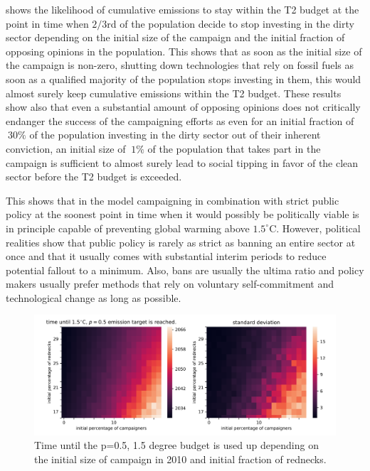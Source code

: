  shows the likelihood of cumulative emissions to stay within the T2 budget at the point in time when $2/3$rd of the population decide to stop investing in the dirty sector depending on the initial size of the campaign and the initial fraction of opposing opinions in the population. This shows that as soon as the initial size of the campaign is non-zero, shutting down technologies that rely on fossil fuels as soon as a qualified majority of the population stops investing in them, this would almost surely keep cumulative emissions within the T2 budget. These results show also that even a substantial amount of opposing opinions does not critically endanger the success of the campaigning efforts as even for an initial fraction of $~30\%$ of the population investing in the dirty sector out of their inherent conviction, an initial size of $~1\%$ of the population that takes part in the campaign is sufficient to almost surely lead to social tipping in favor of the clean sector before the T2 budget is exceeded.

This shows that in the model campaigning in combination with strict public policy at the soonest point in time when it would possibly be politically viable is in principle capable of preventing global warming above $1.5^{\circ}$C.
However, political realities show that public policy is rarely as strict as banning an entire sector at once and that it usually comes with substantial interim periods to reduce potential fallout to a minimum. Also, bans are usually the ultima ratio and policy makers usually prefer methods that rely on voluntary self-commitment and technological change as long as possible.

\begin{figure}[t]
    \centering
    \includegraphics[width = \textwidth]{figures/time_until_emissions_target.pdf}
    \caption{Time until the p=0.5, 1.5 degree budget is used up depending on the initial size of campaign in 2010 and initial fraction of rednecks.}
    \label{fig:time_until_budget_reached}
\end{figure}

